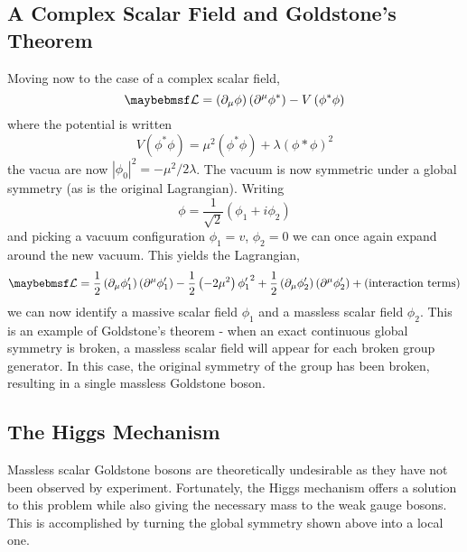 \subsection{A Complex Scalar Field and Goldstone's Theorem}
Moving now to the case of a complex scalar field,
\begin{equation}
\lagrangiand = \left(\partial_{\mu}\phi\right)\left(\partial^{\mu}\phi^*\right)
- V\left(\phi^*\phi\right)
\end{equation}
where the potential is written
\begin{equation}
V\left(\phi^*\phi\right) = \mu^2\left(\phi^*\phi\right) +
\lambda\left(\phi*\phi\right)^2
\end{equation}
the vacua are now $\left|\phi_0\right|^2 = -\mu^2/2\lambda$. The vacuum is now
symmetric under a global \Uone symmetry (as is the original Lagrangian). Writing
\begin{equation}
\phi = \frac{1}{\sqrt{2}}\left(\phi_1 + i\phi_2\right)
\end{equation}
and picking a vacuum configuration $\phi_1 = v$, $\phi_2 = 0$ we can once again
expand around the new vacuum. This yields the Lagrangian,
\begin{equation}
  \lagrangiand =
  \frac{1}{2}\left(\partial_{\mu}\phi'_1\right)\left(\partial^{\mu}\phi'_1\right)
  -\frac{1}{2}\left(-2\mu^2\right){\phi'_1}^2 +
  \frac{1}{2}\left(\partial_{\mu}\phi'_2\right)\left(\partial^{\mu}\phi'_2\right)
  + \textrm{(interaction terms)}
\end{equation}
we can now identify a massive scalar field $\phi_1$ and a massless scalar field
$\phi_2$. This is an example of Goldstone's theorem - when an exact continuous
global symmetry is broken, a massless scalar field will appear for each broken
group generator. In this case, the original \Uone symmetry of the group has been
broken, resulting in a single massless Goldstone boson.

\subsection{The Higgs Mechanism}
\label{sec:sm_higgs}
Massless scalar Goldstone bosons are theoretically undesirable as they have not
been observed by experiment. Fortunately, the Higgs mechanism\cite{higgs} offers
a solution to this problem while also giving the necessary mass to the weak
gauge bosons. This is accomplished by turning the global symmetry shown above
into a local one.

